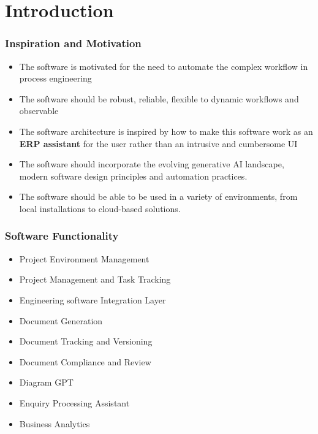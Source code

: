 \section{Introduction}
\begin{frame}
  \frametitle{Inspiration and Motivation}
  \begin{itemize}
    \item The software is motivated for the need to automate the complex workflow in process engineering
    \item The software should be robust, reliable, flexible to dynamic workflows and observable 
    \item The software architecture is inspired by how to make this software work as an \textbf{ERP assistant} for the user rather than an intrusive and cumbersome UI 
    \item The software should incorporate the evolving generative AI landscape, modern software design principles and automation practices.
    \item The software should be able to be used in a variety of environments, from local installations to cloud-based solutions. 
  \end{itemize}
\end{frame}
\begin{frame}
    \frametitle{Software Functionality}
    \begin{itemize}
        \item Project Environment Management
        \item Project Management and Task Tracking
        \item Engineering software Integration Layer
        \item Document Generation
        \item Document Tracking and Versioning
        \item Document Compliance and Review
        \item Diagram GPT
        \item Enquiry Processing Assistant
        \item Business Analytics
    \end{itemize}
\end{frame}

